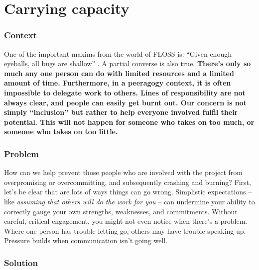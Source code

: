 \section{Carrying capacity}\label{sec:Carrying capacity}

\subsubsection*{Context}

One of the important maxims from the world of FLOSS is:
``Given enough eyeballs, all bugs are shallow'' \cite[p.~30]{raymond2001cathedral}.
A partial converse is also true.
\textbf{There's only so much any one person can do with limited resources and a limited amount of time.
Furthermore, in a peeragogy context, it is often impossible to delegate work to others.
Lines of responsibility are not always clear, and people can easily get burnt out.
Our concern is not simply ``inclusion'' but rather to help everyone involved fulfil their potential.
This will not happen for someone who takes on too much, or someone who takes on too little.}

\subsubsection*{Problem}

How can we help prevent those people who are involved with the project from overpromising or overcommitting, and subsequently crashing and burning?  First, let's be clear that are lots of ways things can go wrong.  Simplistic expectations -- like \emph{assuming that others will do the work for you} \cite{torvalds-interview} -- can undermine your ability to correctly gauge your own strengths, weaknesses, and commitments.  Without careful, critical engagement, you might not even notice when there's a problem.  Where one person has trouble letting go, others may have trouble speaking up.  Pressure builds when communication isn't going well.  

\subsubsection*{Solution}

